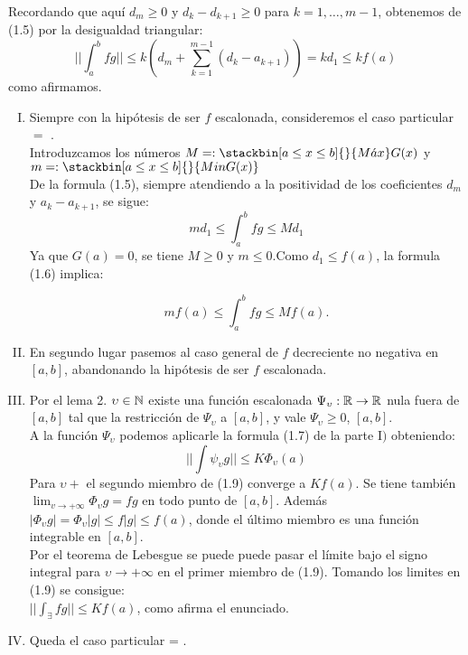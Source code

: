 Recordando que aquí $d_m \geq 0$ y $d_k -d_{k+1} \geq 0$ para $k=1, \ldots, m-1$, obtenemos de (1.5) por la desigualdad triangular:
\begin{equation}
|| \int_a^b fg || \leq k(d_m +\sum_{k=1}^{m-1} (d_k -a_{k+1}))=kd_1 \leq k f(a)
\end{equation}
como afirmamos.
\begin{enumerate}[I)]
\item Siempre con la hipótesis de ser $f$ escalonada, consideremos el caso particular \F$=$ \R .\\
Introduzcamos los números $M=: \stackbin[a \leq x \leq b]{}{M\acute{a}x} G(x)$ y $m=:\stackbin[a \leq x \leq b]{}{Min G(x)}$ \\
De la formula (1.5), siempre atendiendo a la positividad de los coeficientes $d_m$ y $a_k-a_{k+1}$, se sigue: 
\begin{equation}
md_1 \leq \int_a ^ bfg \leq Md_1
\end{equation}
Ya que $G(a)=0$, se tiene $M \geq 0$ y $m \leq 0$.Como $d_1 \leq f(a)$, la formula (1.6) implica:

\begin{equation}
mf(a) \leq \int_a^b fg \leq Mf(a).
\end{equation}
\item En segundo lugar pasemos al caso general de $f$ decreciente no negativa en $[a,b]$, abandonando la hipótesis de ser $f$ escalonada.
\item Por el lema 2. \todo \phantom{} $\upsilon \in \mathbb{N}$ existe una función escalonada $\Psi_\upsilon: \mathbb{R} \rightarrow \mathbb{R}$ nula fuera de $[a,b]$ tal que la restricción de $\Psi_\upsilon$ a $[a,b]$, y vale $\Psi_\upsilon \geq 0$, \todo \phantom{} \x \en $[a,b]$.\\
A la función $\Psi_\upsilon$ podemos aplicarle la formula (1.7) de la parte $\mathrm{I})$ obteniendo:
\begin{equation}
|| \int \psi_\upsilon g || \leq K  \Phi_\upsilon (a)
\end{equation}
Para $\upsilon+ $ el segundo miembro de (1.9) converge a $Kf(a)$. Se tiene también $\lim_{v \to +\infty} \Phi_\upsilon g=fg$ en todo punto de $[a,b]$. Además $| \Phi_\upsilon g| =\Phi_\upsilon |g| \leq f |g| \leq f(a) $, donde el último miembro es una función integrable en $[a,b]$.\\
Por el teorema de Lebesgue se puede puede pasar el límite bajo el signo integral para $\upsilon \to +\infty$ en el primer miembro de (1.9). Tomando los limites en (1.9) se consigue:\\
$ || \int_ \exists fg || \leq Kf(a)$, como afirma el enunciado.\\
\item Queda el caso particular \F = \R.
\end{enumerate}
